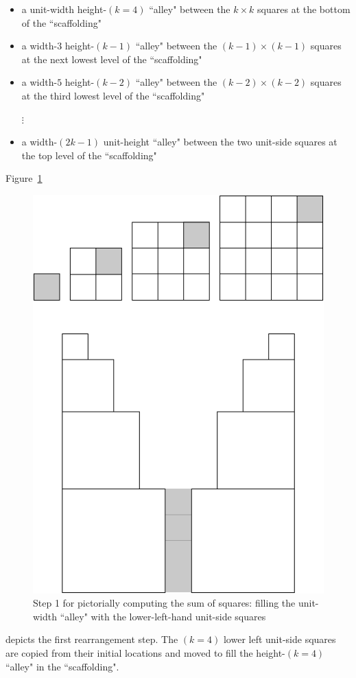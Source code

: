 \begin{itemize}
\item
a unit-width height-$(k=4)$ ``alley" between the $k \times k$ squares at the bottom of the ``scaffolding"
\medskip\item
a width-$3$ height-$(k-1)$ ``alley" between the $(k-1) \times (k-1)$ squares at the next lowest level of the ``scaffolding"
\medskip\item
a width-$5$ height-$(k-2)$ ``alley" between the $(k-2) \times (k-2)$ squares at the third lowest level of the ``scaffolding"

\hspace*{.5in}$\vdots$
\medskip\item
a width-$(2k-1)$ unit-height ``alley" between the two unit-side squares at the top level of the ``scaffolding"
\end{itemize}

\medskip

Figure~\ref{fig:sumSquares2}
\begin{figure}[htb]
\begin{center}
       \includegraphics[scale=0.3]{FiguresMaths/SumSquares2}
\caption{Step 1 for pictorially computing the sum of squares: filling the unit-width ``alley" with the lower-left-hand unit-side squares}
       \label{fig:sumSquares2}
\end{center}
\end{figure}
depicts the first rearrangement step.  The $(k=4)$ lower left unit-side squares are copied from their initial locations and moved to fill the height-$(k=4)$ ``alley" in the ``scaffolding".

